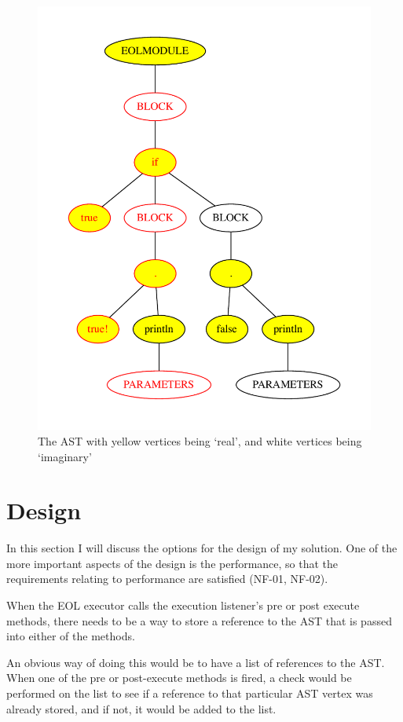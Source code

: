 \begin{figure}
	\centering
	\includegraphics[scale=0.5]{figures/ifElseRealAST.pdf}
	\caption{The AST with yellow vertices being `real', and white vertices being `imaginary'}
	\label{fig:ifElseASTreal}
\end{figure}

\section{Design}

In this section I will discuss the options for the design of my solution. One of the more important aspects of the design is the performance, so that the requirements relating to performance are satisfied (NF-01, NF-02).

When the EOL executor calls the execution listener's pre or post execute methods, there needs to be a way to store a reference to the AST that is passed into either of the methods.

An obvious way of doing this would be to have a list of references to the AST. When one of the pre or post-execute methods is fired, a check would be performed on the list to see if a reference to that particular AST vertex was already stored, and if not, it would be added to the list.

